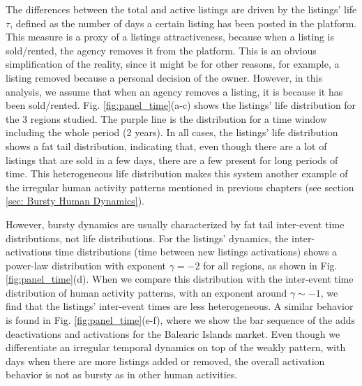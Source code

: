 The differences between the total and active listings are driven by the listings' life $\tau$, defined as the number of days a certain listing has been posted in the platform. This measure is a proxy of a listings attractiveness, because when a listing is sold/rented, the agency removes it from the platform. This is an obvious simplification of the reality, since it might be for other reasons, for example, a listing removed because a personal decision of the owner. However, in this analysis, we assume that when an agency removes a listing, it is because it has been sold/rented. Fig. \ref{fig:panel_time}(a-c) shows the listings' life distribution for the 3 regions studied. The purple line is the distribution for a time window including the whole period (2 years). In all cases, the listings' life distribution shows a fat tail distribution, indicating that, even though there are a lot of listings that are sold in a few days, there are a few present for long periods of time. This heterogeneous life distribution makes this system another example of the irregular human activity patterns mentioned in previous chapters (see section \ref{sec: Bursty Human Dynamics}).

However, bursty dynamics are usually characterized by fat tail inter-event time distributions, not life distributions. For the listings' dynamics, the inter-activations time distributions (time between new listings activations) shows a power-law distribution with exponent $\gamma = -2$ for all regions, as shown in Fig. \ref{fig:panel_time}(d). When we compare this distribution with the inter-event time distribution of human activity patterns, with an exponent around $\gamma \sim -1$, we find that the listings' inter-event times are less heterogeneous. A similar behavior is found in Fig. \ref{fig:panel_time}(e-f), where we show the bar sequence of the adds deactivations and activations for the Balearic Islands market. Even though we differentiate an irregular temporal dynamics on top of the weakly pattern, with days when there are more listings added or removed, the overall activation behavior is not as bursty as in other human activities.

